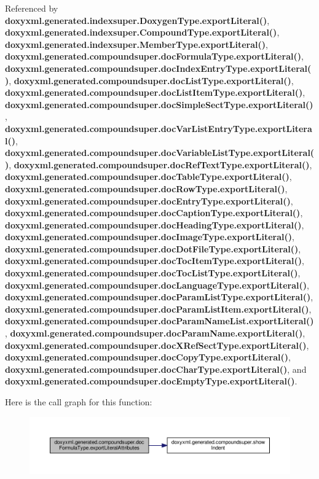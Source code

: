 Referenced by {\bf doxyxml.\+generated.\+indexsuper.\+Doxygen\+Type.\+export\+Literal()}, {\bf doxyxml.\+generated.\+indexsuper.\+Compound\+Type.\+export\+Literal()}, {\bf doxyxml.\+generated.\+indexsuper.\+Member\+Type.\+export\+Literal()}, {\bf doxyxml.\+generated.\+compoundsuper.\+doc\+Formula\+Type.\+export\+Literal()}, {\bf doxyxml.\+generated.\+compoundsuper.\+doc\+Index\+Entry\+Type.\+export\+Literal()}, {\bf doxyxml.\+generated.\+compoundsuper.\+doc\+List\+Type.\+export\+Literal()}, {\bf doxyxml.\+generated.\+compoundsuper.\+doc\+List\+Item\+Type.\+export\+Literal()}, {\bf doxyxml.\+generated.\+compoundsuper.\+doc\+Simple\+Sect\+Type.\+export\+Literal()}, {\bf doxyxml.\+generated.\+compoundsuper.\+doc\+Var\+List\+Entry\+Type.\+export\+Literal()}, {\bf doxyxml.\+generated.\+compoundsuper.\+doc\+Variable\+List\+Type.\+export\+Literal()}, {\bf doxyxml.\+generated.\+compoundsuper.\+doc\+Ref\+Text\+Type.\+export\+Literal()}, {\bf doxyxml.\+generated.\+compoundsuper.\+doc\+Table\+Type.\+export\+Literal()}, {\bf doxyxml.\+generated.\+compoundsuper.\+doc\+Row\+Type.\+export\+Literal()}, {\bf doxyxml.\+generated.\+compoundsuper.\+doc\+Entry\+Type.\+export\+Literal()}, {\bf doxyxml.\+generated.\+compoundsuper.\+doc\+Caption\+Type.\+export\+Literal()}, {\bf doxyxml.\+generated.\+compoundsuper.\+doc\+Heading\+Type.\+export\+Literal()}, {\bf doxyxml.\+generated.\+compoundsuper.\+doc\+Image\+Type.\+export\+Literal()}, {\bf doxyxml.\+generated.\+compoundsuper.\+doc\+Dot\+File\+Type.\+export\+Literal()}, {\bf doxyxml.\+generated.\+compoundsuper.\+doc\+Toc\+Item\+Type.\+export\+Literal()}, {\bf doxyxml.\+generated.\+compoundsuper.\+doc\+Toc\+List\+Type.\+export\+Literal()}, {\bf doxyxml.\+generated.\+compoundsuper.\+doc\+Language\+Type.\+export\+Literal()}, {\bf doxyxml.\+generated.\+compoundsuper.\+doc\+Param\+List\+Type.\+export\+Literal()}, {\bf doxyxml.\+generated.\+compoundsuper.\+doc\+Param\+List\+Item.\+export\+Literal()}, {\bf doxyxml.\+generated.\+compoundsuper.\+doc\+Param\+Name\+List.\+export\+Literal()}, {\bf doxyxml.\+generated.\+compoundsuper.\+doc\+Param\+Name.\+export\+Literal()}, {\bf doxyxml.\+generated.\+compoundsuper.\+doc\+X\+Ref\+Sect\+Type.\+export\+Literal()}, {\bf doxyxml.\+generated.\+compoundsuper.\+doc\+Copy\+Type.\+export\+Literal()}, {\bf doxyxml.\+generated.\+compoundsuper.\+doc\+Char\+Type.\+export\+Literal()}, and {\bf doxyxml.\+generated.\+compoundsuper.\+doc\+Empty\+Type.\+export\+Literal()}.



Here is the call graph for this function\+:
\nopagebreak
\begin{figure}[H]
\begin{center}
\leavevmode
\includegraphics[width=350pt]{d5/d88/classdoxyxml_1_1generated_1_1compoundsuper_1_1docFormulaType_ae684eafa5afd914491b7d30266a6dac8_cgraph}
\end{center}
\end{figure}




